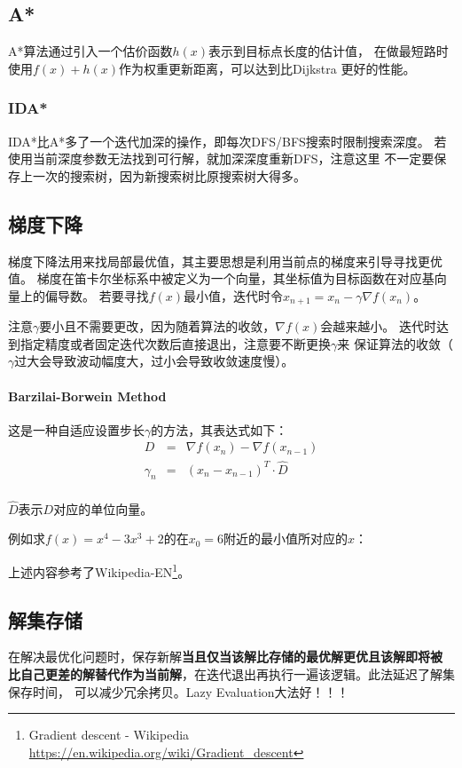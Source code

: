\subsection{A*}
A*算法通过引入一个估价函数$h(x)$表示到目标点长度的估计值，
在做最短路时使用$f(x)+h(x)$作为权重更新距离，可以达到比Dijkstra
更好的性能。
\subsubsection{IDA*}
IDA*比A*多了一个迭代加深的操作，即每次DFS/BFS搜索时限制搜索深度。
若使用当前深度参数无法找到可行解，就加深深度重新DFS，注意这里
不一定要保存上一次的搜索树，因为新搜索树比原搜索树大得多。
\subsection{梯度下降}
梯度下降法用来找局部最优值，其主要思想是利用当前点的梯度来引导寻找更优值。
梯度在笛卡尔坐标系中被定义为一个向量，其坐标值为目标函数在对应基向量上的偏导数。
若要寻找$f(x)$最小值，迭代时令$x_{n+1}=x_n-\gamma \nabla f(x_n)$。

注意$\gamma$要小且不需要更改，因为随着算法的收敛，$\nabla f(x)$会越来越小。
迭代时达到指定精度或者固定迭代次数后直接退出，注意要不断更换$\gamma$来
保证算法的收敛（$\gamma$过大会导致波动幅度大，过小会导致收敛速度慢）。

\paragraph{Barzilai-Borwein Method}
这是一种自适应设置步长$\gamma$的方法，其表达式如下：
\begin{eqnarray*}
	D&=&\nabla f(x_n)-\nabla f(x_{n-1})\\
	\gamma_n&=&(x_n-x_{n-1})^T\cdot \hat{D}\\
\end{eqnarray*}

$\hat{D}$表示$D$对应的单位向量。

例如求$f(x)=x^4-3x^3+2$的在$x_0=6$附近的最小值所对应的$x$：



上述内容参考了Wikipedia-EN\footnote{
	Gradient descent - Wikipedia
	\url{https://en.wikipedia.org/wiki/Gradient\_descent}
}。
\subsection{解集存储}
在解决最优化问题时，保存新解{\bfseries 当且仅当该解比存储的最优解更优且该解即将被
比自己更差的解替代作为当前解}，在迭代退出再执行一遍该逻辑。此法延迟了解集保存时间，
可以减少冗余拷贝。Lazy Evaluation大法好！！！
